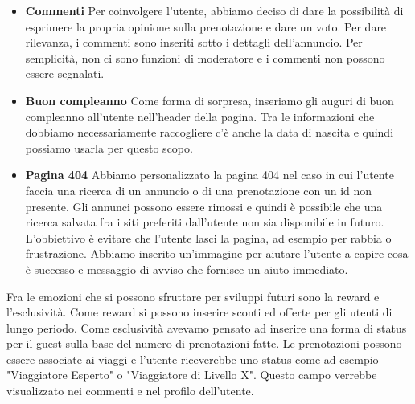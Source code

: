 \documentclass[1_relazione.tex]{subfiles}
\begin{document}
    \begin{itemize}
        \item \textbf{Commenti} Per coinvolgere l'utente, abbiamo deciso di dare la possibilit\`{a} di esprimere la propria opinione sulla prenotazione e dare un voto. Per dare rilevanza, i commenti sono inseriti sotto i dettagli dell'annuncio. Per semplicit\`{a}, non ci sono funzioni di moderatore e i commenti non possono essere segnalati.

        \item \textbf{Buon compleanno} Come forma di sorpresa, inseriamo gli auguri di buon compleanno all'utente nell'header della pagina. Tra le informazioni che dobbiamo necessariamente raccogliere c'è anche la data di nascita e quindi possiamo usarla per questo scopo.

        \item \textbf{Pagina 404} Abbiamo personalizzato la pagina 404 nel caso in cui l'utente faccia una ricerca di un annuncio o di una prenotazione con un id non presente. Gli annunci possono essere rimossi e quindi è possibile che una ricerca salvata fra i siti preferiti dall'utente non sia disponibile in futuro. L'obbiettivo è evitare che l'utente lasci la pagina, ad esempio per rabbia o frustrazione. Abbiamo inserito un'immagine per aiutare l'utente a capire cosa è successo e messaggio di avviso che fornisce un aiuto immediato.

    \end{itemize}

    Fra le emozioni che si possono sfruttare per sviluppi futuri sono la reward e l'esclusivit\`{a}. Come reward si possono inserire sconti ed offerte per gli utenti di lungo periodo. Come esclusivit\`{a} avevamo pensato ad inserire una forma di status per il guest sulla base del numero di prenotazioni fatte. Le prenotazioni possono essere associate ai viaggi e l'utente riceverebbe uno status come ad esempio "Viaggiatore Esperto" o "Viaggiatore di Livello X". Questo campo verrebbe visualizzato nei commenti e nel profilo dell'utente.
\end{document}
